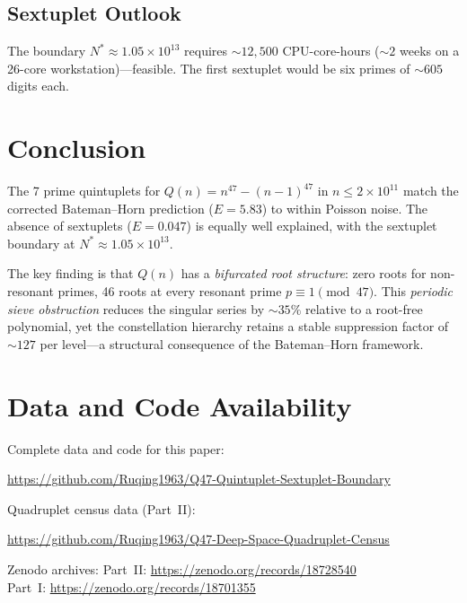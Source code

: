 \documentclass[11pt,a4paper]{article}
\begin{document}
\subsection{Sextuplet Outlook}

The boundary $N^* \approx 1.05 \times 10^{13}$ requires ${\sim}12{,}500$
CPU-core-hours (${\sim}2$ weeks on a 26-core workstation)---feasible.
The first sextuplet would be six primes of ${\sim}605$ digits each.


\section{Conclusion}

The 7 prime quintuplets for $Q(n) = n^{47} - (n{-}1)^{47}$ in
$n \leq 2 \times 10^{11}$ match the corrected Bateman--Horn
prediction ($E = 5.83$) to within Poisson noise.
The absence of sextuplets ($E = 0.047$) is equally well explained,
with the sextuplet boundary at $N^* \approx 1.05 \times 10^{13}$.

The key finding is that $Q(n)$ has a \emph{bifurcated root structure}:
zero roots for non-resonant primes, 46 roots at every resonant prime
$p \equiv 1 \pmod{47}$.  This \emph{periodic sieve obstruction}
reduces the singular series by ${\sim}35\%$ relative to a root-free
polynomial, yet the constellation hierarchy retains a stable
suppression factor of ${\sim}127$ per level---a structural consequence
of the Bateman--Horn framework.


\section*{Data and Code Availability}

Complete data and code for this paper:
\begin{center}
\url{https://github.com/Ruqing1963/Q47-Quintuplet-Sextuplet-Boundary}
\end{center}
\noindent Quadruplet census data (Part~II):
\begin{center}
\url{https://github.com/Ruqing1963/Q47-Deep-Space-Quadruplet-Census}
\end{center}
\noindent Zenodo archives:
Part~II: \url{https://zenodo.org/records/18728540} \\
Part~I: \url{https://zenodo.org/records/18701355}
\end{document}
